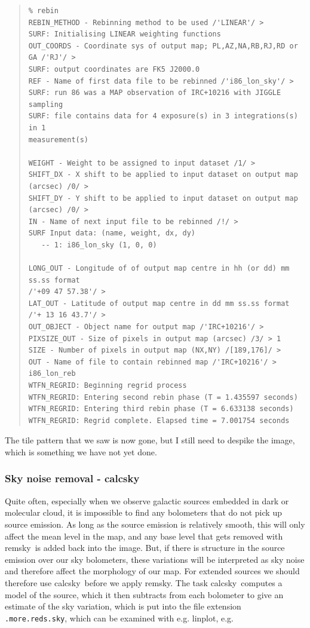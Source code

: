 \documentclass[twoside,11pt]{article}
\newenvironment{myquote}{\begin{quote}\begin{small}}{\end{small}\end{quote}}
\newcommand{\task}[1]{\textsf{#1}}
\newcommand{\calcsky}{\xref{\task{calcsky}}{sun216}{CALCSKY}}
\newcommand{\remsky}{\xref{\task{remsky}}{sun216}{REMSKY}}
\newcommand{\linplot}{\xref{\task{linplot}}{sun95}{LINPLOT}}
\newcommand{\xref}[3]{#1}
\newcommand{\xlabel}[1]{}
\renewcommand{\_}{\texttt{\symbol{95}}}
\begin{document}
\begin{myquote}
\begin{verbatim}
% rebin
REBIN_METHOD - Rebinning method to be used /'LINEAR'/ > 
SURF: Initialising LINEAR weighting functions
OUT_COORDS - Coordinate sys of output map; PL,AZ,NA,RB,RJ,RD or GA /'RJ'/ > 
SURF: output coordinates are FK5 J2000.0
REF - Name of first data file to be rebinned /'i86_lon_sky'/ > 
SURF: run 86 was a MAP observation of IRC+10216 with JIGGLE sampling
SURF: file contains data for 4 exposure(s) in 3 integrations(s) in 1
measurement(s)
 
WEIGHT - Weight to be assigned to input dataset /1/ > 
SHIFT_DX - X shift to be applied to input dataset on output map (arcsec) /0/ > 
SHIFT_DY - Y shift to be applied to input dataset on output map (arcsec) /0/ > 
IN - Name of next input file to be rebinned /!/ > 
SURF Input data: (name, weight, dx, dy)
   -- 1: i86_lon_sky (1, 0, 0)
 
LONG_OUT - Longitude of of output map centre in hh (or dd) mm ss.ss format 
/'+09 47 57.38'/ > 
LAT_OUT - Latitude of output map centre in dd mm ss.ss format 
/'+ 13 16 43.7'/ > 
OUT_OBJECT - Object name for output map /'IRC+10216'/ > 
PIXSIZE_OUT - Size of pixels in output map (arcsec) /3/ > 1
SIZE - Number of pixels in output map (NX,NY) /[189,176]/ > 
OUT - Name of file to contain rebinned map /'IRC+10216'/ > i86_lon_reb
WTFN_REGRID: Beginning regrid process
WTFN_REGRID: Entering second rebin phase (T = 1.435597 seconds)
WTFN_REGRID: Entering third rebin phase (T = 6.633138 seconds)
WTFN_REGRID: Regrid complete. Elapsed time = 7.001754 seconds
\end{verbatim}
\end{myquote}

The tile pattern that we saw is now gone, but I still need to despike
the image, which is something we have not yet done.


\subsubsection{\xlabel{Sky_Noise_Removal_calcsky}Sky noise removal - \calcsky \label{Sky_Noise_Removal_calcsky}}

Quite often, especially when we observe galactic sources embedded in
dark or molecular cloud, it is impossible to find any bolometers that
do not pick up source emission. As long as the source emission is
relatively smooth, this will only affect the mean level in the map, and
any base level that gets removed with \remsky\ is added back into the
image. But, if there is structure in the source emission over our sky
bolometers, these variations will be interpreted as sky noise and
therefore affect the morphology of our map. For extended sources we
should therefore use \calcsky\ before we apply \remsky. The task
\calcsky\ computes a model of the source, which it then subtracts from
each bolometer to give an estimate of the sky variation, which is put
into the file extension \texttt{.more.reds.sky}, which can be examined with
e.g. \linplot, e.g.
\end{document}
